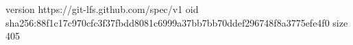version https://git-lfs.github.com/spec/v1
oid sha256:88f1c17c970cfc3f37fbdd8081c6999a37bb7bb70ddef296748f8a3775efe4f0
size 405
